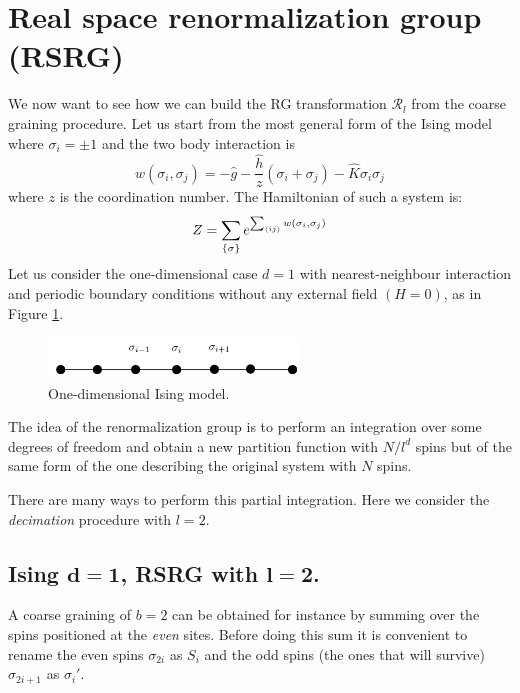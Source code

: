 \documentclass[../main/main.tex]{subfiles}
\begin{document}
\section{Real space renormalization group (RSRG)}
We now want to see how we can build the RG transformation \( \mathcal{R}_l \) from the coarse graining procedure.
Let us start from the most general form of the Ising model where \( \sigma _i = \pm 1 \) and the two body interaction is
\begin{equation}
  w (\sigma _i, \sigma _j) = - \hat{g} - \frac{\hat{h} }{z} (\sigma _i + \sigma _j) - \hat{K} \sigma _i \sigma _j
\end{equation}
where \( z \) is the coordination number. The Hamiltonian of such a system is:
\begin{equation}
  Z = \sum_{\{ \sigma  \}  }^{}  e^{\sum_{\expval{ij} }^{}  w (\sigma _i, \sigma _j)}
\end{equation}
Let us consider the one-dimensional case \( d=1 \)  with nearest-neighbour interaction and periodic boundary conditions without any external field \( (H=0) \), as in Figure \ref{fig:20_4}.

\begin{figure}[h!]
\centering
\includegraphics[width=0.6\textwidth]{../lessons/20_image/4.pdf}
\caption{\label{fig:20_4} One-dimensional Ising model.}
\end{figure}

The idea of the renormalization group is to perform an integration over some degrees of freedom and obtain a new partition function with \( N/l^d \) spins but of the same form of the one describing the original system with \( N \) spins.

There are many ways to perform this partial integration. Here we consider the \emph{decimation} procedure with \( l=2 \).

\subsection{Ising \( \pmb{d=1} \), RSRG with \( \pmb{l=2} \).}
A coarse graining of \( b=2  \) can be obtained for instance by summing over the spins positioned at the \emph{even} sites. Before doing this sum it is convenient to rename the even spins \( \sigma _{2i} \) as \( S_i \) and the odd spins (the ones that will survive) \( \sigma _{2i+1} \) as \( \sigma _i' \).
\end{document}
